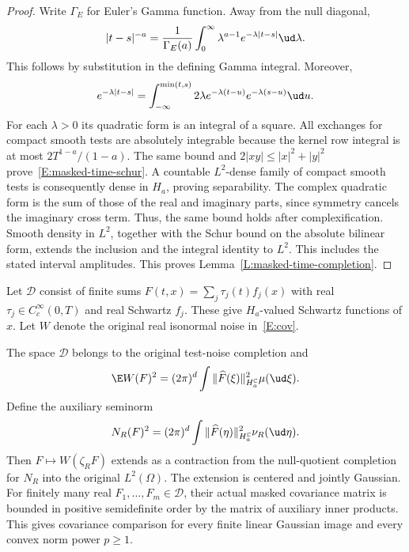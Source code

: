 \begin{proof}
  Write $\Gamma_E$ for Euler's Gamma function. Away from the null diagonal,
  \[
    |t-s|^{-a} = \frac1{\Gamma_E(a)}\int_0^\infty
    \lambda^{a-1}e^{-\lambda|t-s|}\ud\lambda.
  \]
  This follows by substitution in the defining Gamma integral. Moreover,
  \[
    e^{-\lambda|t-s|}
    = \int_{-\infty}^{\min(t,s)}2\lambda
    e^{-\lambda(t-u)}e^{-\lambda(s-u)}\ud u.
  \]
  For each $\lambda > 0$ its quadratic form is an integral of a square.
  All exchanges for compact smooth tests are absolutely integrable because
  the kernel row integral is at most $2T^{1-a}/(1-a)$. The same bound and
  $2|xy| \le |x|^2+|y|^2$ prove~\eqref{E:masked-time-schur}.
  A countable $L^2$-dense family of compact smooth tests is consequently
  dense in $H_a$, proving separability. The complex quadratic form is the
  sum of those of the real and imaginary parts, since symmetry cancels
  the imaginary cross term. Thus, the same bound holds after
  complexification. Smooth density in $L^2$, together with the Schur
  bound on the absolute bilinear form, extends the inclusion and the
  integral identity to $L^2$. This includes the stated interval amplitudes.
  This proves Lemma~\ref{L:masked-time-completion}.
\end{proof}

Let $\mathcal D$ consist of finite sums
$F(t,x) = \sum_j\tau_j(t)f_j(x)$ with real
$\tau_j \in C_c^\infty(0,T)$ and real Schwartz $f_j$.
These give $H_a$-valued Schwartz functions of $x$. Let $W$ denote the
original real isonormal noise in~\eqref{E:cov}.

\begin{proposition}\label{P:masked-noise-completion}
  The space $\mathcal D$ belongs to the original test-noise completion and
  \begin{equation}\label{E:masked-actual-noise-norm}
    \E W(F)^2 = (2\pi)^d\int
    \|\widehat F(\xi)\|_{H_a^{\mathbb C}}^2\mu(\ud\xi).
  \end{equation}
  Define the auxiliary seminorm
  \[
    N_R(F)^2 = (2\pi)^d\int
    \|\widehat F(\eta)\|_{H_a^{\mathbb C}}^2\nu_R(\ud\eta).
  \]
  Then $F \mapsto W(\zeta_RF)$ extends as a contraction from the
  null-quotient completion for $N_R$ into the original $L^2(\Omega)$.
  The extension is centered and jointly Gaussian. For finitely many real
  $F_1,\ldots,F_m \in \mathcal D$, their actual masked covariance matrix
  is bounded in positive semidefinite order by the matrix of auxiliary
  inner products. This gives covariance comparison for every finite linear
  Gaussian image and every convex norm power $p \ge 1$.
\end{proposition}

